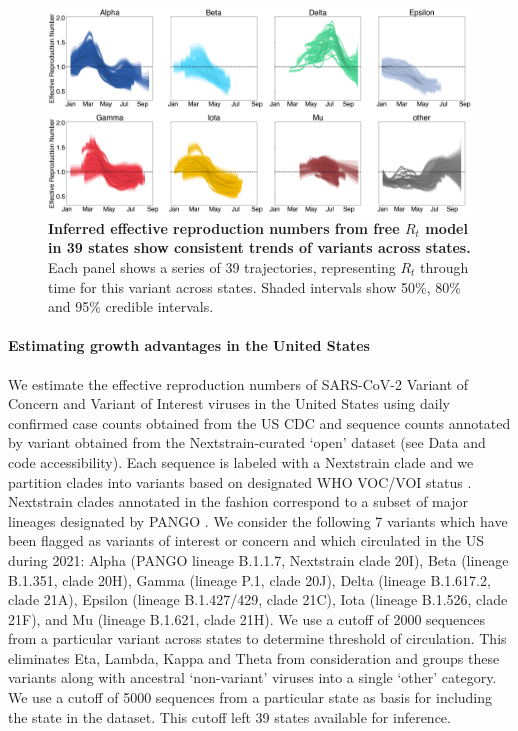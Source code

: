 \documentclass[11pt,oneside,letterpaper]{article}
\begin{document}
\begin{figure}[t]
  \centering
  \includegraphics[width=\linewidth]{figs/rt_consensus.png}
  \caption{\textbf{Inferred effective reproduction numbers from free $R_t$ model in 39 states show consistent trends of variants across states.}
  Each panel shows a series of 39 trajectories, representing $R_t$ through time for this variant across states.
  Shaded intervals show 50\%, 80\% and 95\% credible intervals.
  }
  \label{fig:rt_consensus}
\end{figure}

\paragraph{Estimating growth advantages in the United States}

We estimate the effective reproduction numbers of SARS-CoV-2 Variant of Concern and Variant of Interest viruses in the United States using daily confirmed case counts obtained from the US CDC and sequence counts annotated by variant obtained from the Nextstrain-curated `open' dataset \cite{Hadfield2018} (see Data and code accessibility).
Each sequence is labeled with a Nextstrain clade \cite{Hadfield2018} and we partition clades into variants based on designated WHO VOC/VOI status \cite{Konings2021}.
Nextstrain clades annotated in the fashion correspond to a subset of major lineages designated by PANGO \cite{Rambaut2020}.
We consider the following 7 variants which have been flagged as variants of interest or concern and which circulated in the US during 2021: Alpha (PANGO lineage B.1.1.7, Nextstrain clade 20I), Beta (lineage B.1.351, clade 20H), Gamma (lineage P.1, clade 20J), Delta (lineage B.1.617.2, clade 21A), Epsilon (lineage B.1.427/429, clade 21C), Iota (lineage B.1.526, clade 21F), and Mu (lineage B.1.621, clade 21H).
We use a cutoff of 2000 sequences from a particular variant across states to determine threshold of circulation.
This eliminates Eta, Lambda, Kappa and Theta from consideration and groups these variants along with ancestral `non-variant' viruses into a single `other' category.
We use a cutoff of 5000 sequences from a particular state as basis for including the state in the dataset.
This cutoff left 39 states available for inference.
\end{document}
